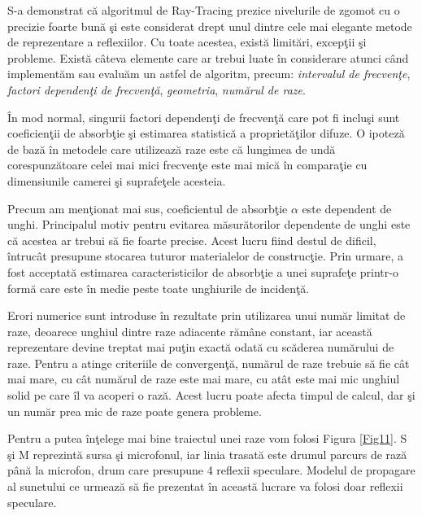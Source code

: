 	S-a demonstrat c\u{a} algoritmul de Ray-Tracing prezice nivelurile de zgomot cu o precizie foarte bun\u{a} \c{s}i este considerat drept unul dintre cele mai elegante metode de reprezentare a reflexiilor. Cu toate acestea, exist\u{a} limit\u{a}ri, excep\c{t}ii \c{s}i probleme. Exist\u{a} c\^{a}teva elemente care ar trebui luate \^{i}n considerare atunci c\^{a}nd implement\u{a}m sau evalu\u{a}m un astfel de algoritm, precum: \textit{intervalul de frecven\c{t}e}, \textit{factori dependen\c{t}i de frecven\c{t}\u{a}}, \textit{geometria}, \textit{num\u{a}rul de raze}.
	\bigskip
	
	\^{I}n mod normal, singurii factori dependen\c{t}i de frecven\c{t}\u{a} care pot fi inclu\c{s}i sunt coeficien\c{t}ii de absorb\c{t}ie \c{s}i estimarea statistic\u{a} a propriet\u{a}\c{t}ilor difuze. O ipotez\u{a} de baz\u{a} \^{i}n metodele care utilizeaz\u{a} raze este c\u{a} lungimea de und\u{a} corespunz\u{a}toare celei mai mici frecven\c{t}e este mai mic\u{a} \^{i}n compara\c{t}ie cu dimensiunile camerei \c{s}i suprafe\c{t}ele acesteia.
	\bigskip
	
	Precum am men\c{t}ionat mai sus, coeficientul de absorb\c{t}ie $\alpha$ este dependent de unghi. Principalul motiv pentru evitarea m\u{a}sur\u{a}torilor dependente de unghi este c\u{a} acestea ar trebui s\u{a} fie foarte precise. Acest lucru fiind destul de dificil, \^{i}ntruc\^{a}t presupune stocarea tuturor materialelor de construc\c{t}ie. Prin urmare, a fost acceptat\u{a} estimarea caracteristicilor de absorb\c{t}ie a unei suprafe\c{t}e printr-o form\u{a} care este \^{i}n medie peste toate unghiurile de inciden\c{t}\u{a}.
	\bigskip
	
	Erori numerice sunt introduse \^{i}n rezultate prin utilizarea unui num\u{a}r limitat de raze, deoarece unghiul dintre raze adiacente r\u{a}m\^{a}ne constant, iar aceast\u{a} reprezentare devine treptat mai pu\c{t}in exact\u{a} odat\u{a} cu sc\u{a}derea num\u{a}rului de raze. Pentru a atinge criteriile de convergen\c{t}\u{a}, num\u{a}rul de raze trebuie s\u{a} fie c\^{a}t mai mare, cu c\^{a}t num\u{a}rul de raze este mai mare, cu at\^{a}t este mai mic unghiul solid pe care \^{i}l va acoperi o raz\u{a}. Acest lucru poate afecta timpul de calcul, dar \c{s}i un num\u{a}r prea mic de raze poate genera probleme. 
	\bigskip
	
	Pentru a putea \^{i}n\c{t}elege mai bine traiectul unei raze vom folosi Figura \ref{Fig11}. S \c{s}i M reprezint\u{a} sursa \c{s}i microfonul, iar linia trasat\u{a} este drumul parcurs de raz\u{a} p\^{a}n\u{a} la microfon, drum care presupune 4 reflexii speculare. Modelul de propagare al sunetului ce urmeaz\u{a} s\u{a} fie prezentat \^{i}n aceast\u{a} lucrare va folosi doar reflexii speculare.
	\bigskip
	
